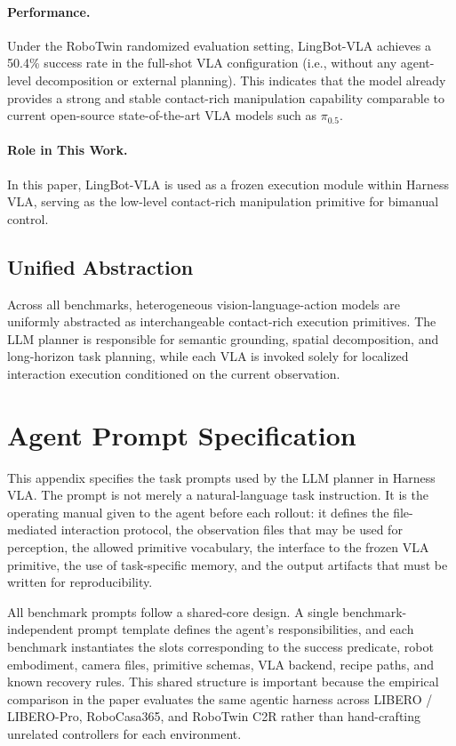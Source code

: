 \documentclass{article}
\begin{document}
\paragraph{Performance.}
Under the RoboTwin randomized evaluation setting, LingBot-VLA achieves a 50.4\% success rate in the full-shot VLA configuration (i.e., without any agent-level decomposition or external planning). This indicates that the model already provides a strong and stable contact-rich manipulation capability comparable to current open-source state-of-the-art VLA models such as $\pi_0.5$.

\paragraph{Role in This Work.}
In this paper, LingBot-VLA is used as a frozen execution module within Harness VLA, serving as the low-level contact-rich manipulation primitive for bimanual control.

\subsection{Unified Abstraction}

Across all benchmarks, heterogeneous vision-language-action models are uniformly abstracted as interchangeable contact-rich execution primitives. The LLM planner is responsible for semantic grounding, spatial decomposition, and long-horizon task planning, while each VLA is invoked solely for localized interaction execution conditioned on the current observation.

\section{Agent Prompt Specification}
\label{app:agent_prompt}

This appendix specifies the task prompts used by the LLM planner in Harness VLA. The
prompt is not merely a natural-language task instruction. It is the operating manual
given to the agent before each rollout: it defines the file-mediated interaction
protocol, the observation files that may be used for perception, the allowed primitive
vocabulary, the interface to the frozen VLA primitive, the use of task-specific memory,
and the output artifacts that must be written for reproducibility.

All benchmark prompts follow a shared-core design. A single benchmark-independent
prompt template defines the agent's responsibilities, and each benchmark instantiates
the slots corresponding to the success predicate, robot embodiment, camera files,
primitive schemas, VLA backend, recipe paths, and known recovery rules. This shared
structure is important because the empirical comparison in the paper evaluates the
same agentic harness across LIBERO / LIBERO-Pro, RoboCasa365, and RoboTwin C2R rather
than hand-crafting unrelated controllers for each environment.
\end{document}

